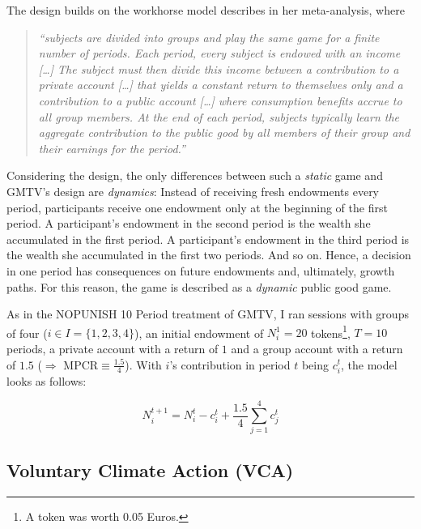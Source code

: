 \documentclass[
  authoryear,
  preprint,
  3p]{elsarticle}
\begin{document}
The design builds on the workhorse model \citet[p.301]{Zelmer2003}
describes in her meta-analysis, where

\begin{quote}
\emph{``subjects are divided into groups and play the same game for a
finite number of periods. Each period, every subject is endowed with an
income {[}\ldots{]} The subject must then divide this income between a
contribution to a private account {[}\ldots{]} that yields a constant
return to themselves only and a contribution to a public account
{[}\ldots{]} where consumption benefits accrue to all group members. At
the end of each period, subjects typically learn the aggregate
contribution to the public good by all members of their group and their
earnings for the period.''}
\end{quote}

Considering the design, the only differences between such a
\emph{static} game and GMTV's design are \emph{dynamics}: Instead of
receiving fresh endowments every period, participants receive one
endowment only at the beginning of the first period. A participant's
endowment in the second period is the wealth she accumulated in the
first period. A participant's endowment in the third period is the
wealth she accumulated in the first two periods. And so on. Hence, a
decision in one period has consequences on future endowments and,
ultimately, growth paths. For this reason, the game is described as a
\emph{dynamic} public good game.

As in the NOPUNISH 10 Period treatment of GMTV, I ran sessions with
groups of four (\(i \in I=\{1,2,3,4\}\)), an initial endowment of
\(N_i^1 = 20\) tokens\footnote{A token was worth 0.05 Euros.}, \(T=10\)
periods, a private account with a return of \(1\) and a group account
with a return of \(1.5\) (\(\Rightarrow\) MPCR\(\equiv \frac{1.5}{4}\)).
With \(i\)'s contribution in period \(t\) being \(c_i^t\), the model
looks as follows:

\[
N_i^{t+1}=N_i^t - c_i^t + \frac{1.5}{4}\sum_{j=1}^4 c_j^t
\]

\hypertarget{voluntary-climate-action-vca}{%
\subsection{Voluntary Climate Action
(VCA)}\label{voluntary-climate-action-vca}}
\end{document}
